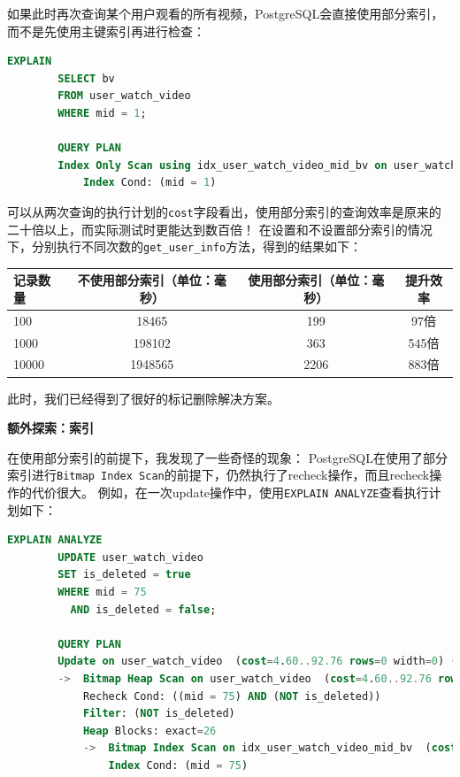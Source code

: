 \documentclass[a4paper,10pt]{ctexart}
\begin{document}
如果此时再次查询某个用户观看的所有视频，PostgreSQL会直接使用部分索引，而不是先使用主键索引再进行检查：
\begin{center}
    \begin{lstlisting}[language=SQL]
        EXPLAIN
        SELECT bv
        FROM user_watch_video
        WHERE mid = 1;

        QUERY PLAN
        Index Only Scan using idx_user_watch_video_mid_bv on user_watch_video  (cost=0.42..4.83 rows=23 width=13)
            Index Cond: (mid = 1)
    \end{lstlisting}
\end{center}

可以从两次查询的执行计划的\texttt{cost}字段看出，使用部分索引的查询效率是原来的二十倍以上，而实际测试时更能达到数百倍！
在设置和不设置部分索引的情况下，分别执行不同次数的\texttt{get\_user\_info}方法，得到的结果如下：
\begin{center}
    \begin{tabular}{lccc}
        \toprule
        \textbf{记录数量} & \textbf{不使用部分索引（单位：毫秒）} & \textbf{使用部分索引（单位：毫秒）} & \textbf{提升效率} \\
        \midrule
        100 & 18465 & 199 & 97倍 \\
        1000 & 198102 & 363 & 545倍 \\
        10000 & 1948565 & 2206 & 883倍 \\
        \bottomrule
    \end{tabular}
\end{center}

此时，我们已经得到了很好的标记删除解决方案。

\vspace{1.5cm}
\textbf{额外探索：索引}

在使用部分索引的前提下，我发现了一些奇怪的现象：
PostgreSQL在使用了部分索引进行\texttt{Bitmap Index Scan}的前提下，仍然执行了recheck操作，而且recheck操作的代价很大。
例如，在一次update操作中，使用\texttt{EXPLAIN ANALYZE}查看执行计划如下：
\begin{center}
    \begin{lstlisting}[language=SQL]
        EXPLAIN ANALYZE
        UPDATE user_watch_video
        SET is_deleted = true
        WHERE mid = 75
          AND is_deleted = false;

        QUERY PLAN
        Update on user_watch_video  (cost=4.60..92.76 rows=0 width=0) (actual time=2.635..2.636 rows=0 loops=1)
        ->  Bitmap Heap Scan on user_watch_video  (cost=4.60..92.76 rows=23 width=7) (actual time=0.046..0.320 rows=26 loops=1)
            Recheck Cond: ((mid = 75) AND (NOT is_deleted))
            Filter: (NOT is_deleted)
            Heap Blocks: exact=26
            ->  Bitmap Index Scan on idx_user_watch_video_mid_bv  (cost=0.00..4.60 rows=23 width=0) (actual time=0.023..0.023 rows=26 loops=1)
                Index Cond: (mid = 75)
    \end{lstlisting}
\end{center}
\end{document}
